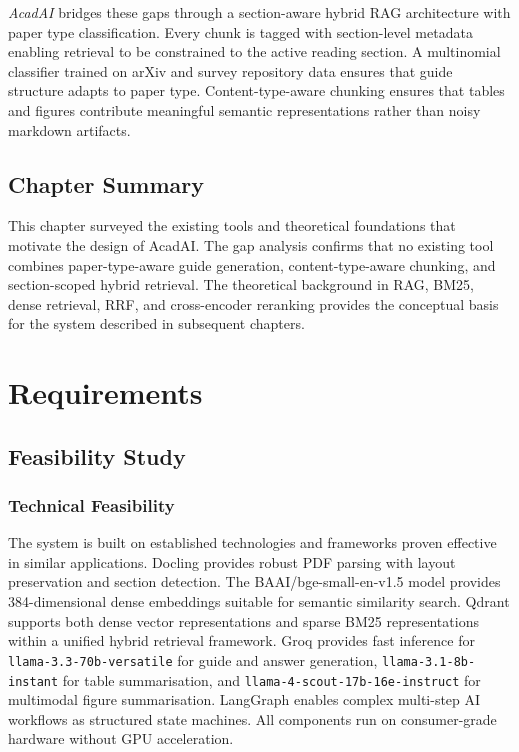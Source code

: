 \documentclass[12pt,a4paper]{report}
\begin{document}
\textit{AcadAI} bridges these gaps through a section-aware hybrid RAG
architecture with paper type classification. Every chunk is tagged with
section-level metadata enabling retrieval to be constrained to the active
reading section. A multinomial classifier trained on arXiv and survey repository
data ensures that guide structure adapts to paper type. Content-type-aware
chunking ensures that tables and figures contribute meaningful semantic
representations rather than noisy markdown artifacts.

\section{Chapter Summary}

This chapter surveyed the existing tools and theoretical foundations that
motivate the design of AcadAI. The gap analysis confirms that no existing tool
combines paper-type-aware guide generation, content-type-aware chunking, and
section-scoped hybrid retrieval. The theoretical background in RAG, BM25, dense
retrieval, RRF, and cross-encoder reranking provides the conceptual basis for
the system described in subsequent chapters.

\chapter{Requirements}
\label{ch:reqmeth}

\section{Feasibility Study}

\subsection{Technical Feasibility}
The system is built on established technologies and frameworks proven effective
in similar applications. Docling provides robust PDF parsing with layout
preservation and section detection. The BAAI/bge-small-en-v1.5 model provides
384-dimensional dense embeddings suitable for semantic similarity search. Qdrant
supports both dense vector representations and sparse BM25 representations
within a unified hybrid retrieval framework. Groq provides fast inference for
\texttt{llama-3.3-70b-versatile} for guide and answer generation,
\texttt{llama-3.1-8b-instant} for table summarisation, and
\texttt{llama-4-scout-17b-16e-instruct} for multimodal figure summarisation.
LangGraph enables complex multi-step AI workflows as structured state machines.
All components run on consumer-grade hardware without GPU acceleration.
\end{document}
